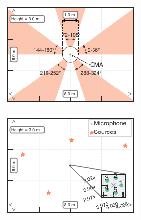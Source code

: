 \documentclass[sip,biber]{now-journal}
\begin{document}
\begin{figure}[t]
  \centering
  \begin{minipage}[t]{.32\linewidth}
    \centering
    \includegraphics[width=\columnwidth]{figures/room_layout_range.pdf}
    \label{fig:layout:range}
  \end{minipage}
  \begin{minipage}[t]{.32\linewidth}
    \centering
    \includegraphics[width=\columnwidth]{figures/room_layout_000.pdf}
    \label{fig:layout:ref}
  \end{minipage}
  \begin{minipage}[t]{.32\linewidth}

\end{minipage}
\end{figure}
\end{document}
